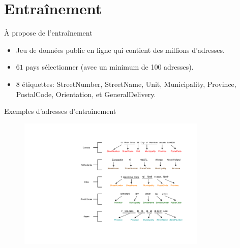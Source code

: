 \documentclass{beamer}
\begin{document}
	\section{Entraînement}
	\begin{frame}{À propose de l'entraînement}
		\begin{itemize}
			\item Jeu de données public en ligne qui contient des millions d'adresses.
			\item $61$ pays sélectionner (avec un minimum de 100 adresses).
			\item 8 étiquettes: StreetNumber, StreetName, Unit, Municipality, Province, PostalCode, Orientation, et GeneralDelivery.
		\end{itemize}
	\end{frame}	
	
	\begin{frame}{Exemples d'adresses d'entraînement}
		\begin{figure}[h!]
			\centering
			\includegraphics[width=0.8\textwidth,height=0.75\textheight,keepaspectratio]{Samples2.pdf}
		\end{figure}
	\end{frame}
	
\end{document}
